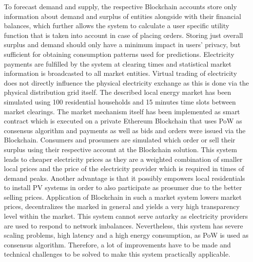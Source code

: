 \documentclass[runningheads]{llncs}
\begin{document}
To forecast demand and supply, the respective Blockchain accounts store only information about demand and surplus of entities alongside with their financial balances, which further allows the system to calculate a user specific utility function that is taken into account in case of placing orders. Storing just overall surplus and demand should only have a minimum impact in users’ privacy, but sufficient for obtaining consumption patterns used for predictions. \cite{mengelkamp_lem} \newline
Electricity payments are fulfilled by the system at clearing times and statistical market information is broadcasted to all market entities. Virtual trading of electricity does not directly influence the physical electricity exchange as this is done via the physical distribution grid itself. \newline
The described local energy market has been simulated using 100 residential households and 15 minutes time slots between market clearings. The market mechanism itself has been implemented as smart contract which is executed on a private Ethereum Blockchain that uses PoW as consensus algorithm and payments as well as bids and orders were issued via the Blockchain. Consumers and prosumers are simulated which order or sell their surplus using their respective account at the Blockchain solution. \newline
This system leads to cheaper electricity prices as they are a weighted combination of smaller local prices and the price of the electricity provider which is required in times of demand peaks. Another advantage is that it possibly empowers local residentials to install PV systems in order to also participate as prosumer due to the better selling prices. Application of Blockchain in such a market system lowers market prices, decentralizes the marked in general and yields a very high transparency level within the market. \cite{mengelkamp_lem}\newline
This system cannot serve autarky as electricity providers are used to respond to network imbalances.
Nevertheless, this system has severe scaling problems, high latency and a high energy consumption, as PoW is used as consensus algorithm. Therefore, a lot of improvements have to be made and technical challenges to be solved to make this system practically applicable.
\end{document}
